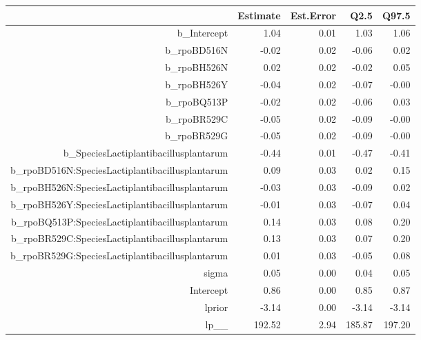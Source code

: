 \begin{table}[ht]
\centering
\begin{tabular}{rrrrr}
  \hline
 & Estimate & Est.Error & Q2.5 & Q97.5 \\ 
  \hline
b\_Intercept & 1.04 & 0.01 & 1.03 & 1.06 \\ 
  b\_rpoBD516N & -0.02 & 0.02 & -0.06 & 0.02 \\ 
  b\_rpoBH526N & 0.02 & 0.02 & -0.02 & 0.05 \\ 
  b\_rpoBH526Y & -0.04 & 0.02 & -0.07 & -0.00 \\ 
  b\_rpoBQ513P & -0.02 & 0.02 & -0.06 & 0.03 \\ 
  b\_rpoBR529C & -0.05 & 0.02 & -0.09 & -0.00 \\ 
  b\_rpoBR529G & -0.05 & 0.02 & -0.09 & -0.00 \\ 
  b\_SpeciesLactiplantibacillusplantarum & -0.44 & 0.01 & -0.47 & -0.41 \\ 
  b\_rpoBD516N:SpeciesLactiplantibacillusplantarum & 0.09 & 0.03 & 0.02 & 0.15 \\ 
  b\_rpoBH526N:SpeciesLactiplantibacillusplantarum & -0.03 & 0.03 & -0.09 & 0.02 \\ 
  b\_rpoBH526Y:SpeciesLactiplantibacillusplantarum & -0.01 & 0.03 & -0.07 & 0.04 \\ 
  b\_rpoBQ513P:SpeciesLactiplantibacillusplantarum & 0.14 & 0.03 & 0.08 & 0.20 \\ 
  b\_rpoBR529C:SpeciesLactiplantibacillusplantarum & 0.13 & 0.03 & 0.07 & 0.20 \\ 
  b\_rpoBR529G:SpeciesLactiplantibacillusplantarum & 0.01 & 0.03 & -0.05 & 0.08 \\ 
  sigma & 0.05 & 0.00 & 0.04 & 0.05 \\ 
  Intercept & 0.86 & 0.00 & 0.85 & 0.87 \\ 
  lprior & -3.14 & 0.00 & -3.14 & -3.14 \\ 
  lp\_\_ & 192.52 & 2.94 & 185.87 & 197.20 \\ 
   \hline
\end{tabular}
\end{table}
